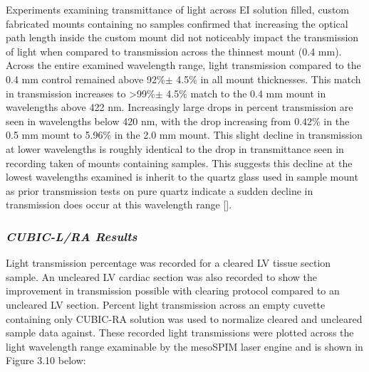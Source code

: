 Experiments examining transmittance of light across EI solution filled, custom fabricated mounts containing no samples confirmed that increasing the optical path length inside the custom mount did not noticeably impact the transmission of light when compared to transmission across the thinnest mount (0.4 mm). Across the entire examined wavelength range, light transmission compared to the 0.4 mm control remained above 92\%$\pm$ 4.5\% in all mount thicknesses. This match in transmission increases to >99\%$\pm$ 4.5\% match to the 0.4 mm mount in wavelengths above 422 nm. Increasingly large drops in percent transmission are seen in wavelengths below 420 nm, with the drop increasing from 0.42\% in the 0.5 mm mount to 5.96\% in the 2.0 mm mount. This slight decline in transmission at lower wavelengths is roughly identical to the drop in transmittance seen in recording taken of mounts containing samples. This suggests this decline at the lowest wavelengths examined is inherit to the quartz glass used in sample mount as prior transmission tests on pure quartz indicate a sudden decline in transmission does occur at this wavelength range [].


\subsubsection{\textit{CUBIC-L/RA Results}}

Light transmission percentage was recorded for a cleared LV tissue section sample. An uncleared LV cardiac section was also recorded to show the improvement in transmission possible with clearing protocol compared to an uncleared LV section.  Percent light transmission across an empty cuvette containing only CUBIC-RA solution was used to normalize cleared and uncleared sample data against. These recorded light transmissions were plotted across the light wavelength range examinable by the mesoSPIM laser engine and is shown in Figure 3.10 below: 

